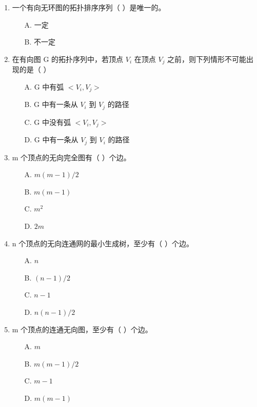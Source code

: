 \documentclass[12pt, a4paper]{article}
\begin{document}
\begin{enumerate}[label=\arabic*.]
	\item 一个有向无环图的拓扑排序序列（ ）是唯一的。
	      \begin{enumerate}
		      \item[A.] 一定
		      \item[B.] 不一定
	      \end{enumerate}

	\item 在有向图 G 的拓扑序列中，若顶点 $V_i$ 在顶点 $V_j$ 之前，则下列情形不可能出现的是（ ）
	      \begin{enumerate}
		      \item[A.] G 中有弧 $<V_i, V_j>$
		      \item[B.] G 中有一条从 $V_i$ 到 $V_j$ 的路径
		      \item[C.] G 中没有弧 $<V_i, V_j>$
		      \item[D.] G 中有一条从 $V_j$ 到 $V_i$ 的路径
	      \end{enumerate}

	\item m 个顶点的无向完全图有（ ）个边。
	      \begin{enumerate}
		      \item[A.] $m(m-1)/2$
		      \item[B.] $m(m-1)$
		      \item[C.] $m^2$
		      \item[D.] $2m$
	      \end{enumerate}

	\item n 个顶点的无向连通网的最小生成树，至少有（ ）个边。
	      \begin{enumerate}
		      \item[A.] $n$
		      \item[B.] $(n-1)/2$
		      \item[C.] $n-1$
		      \item[D.] $n(n-1)/2$
	      \end{enumerate}

	\item m 个顶点的连通无向图，至少有（ ）个边。
	      \begin{enumerate}
		      \item[A.] $m$
		      \item[B.] $m(m-1)/2$
		      \item[C.] $m-1$
		      \item[D.] $m(m-1)$
	      \end{enumerate}


\end{enumerate}
\end{document}
